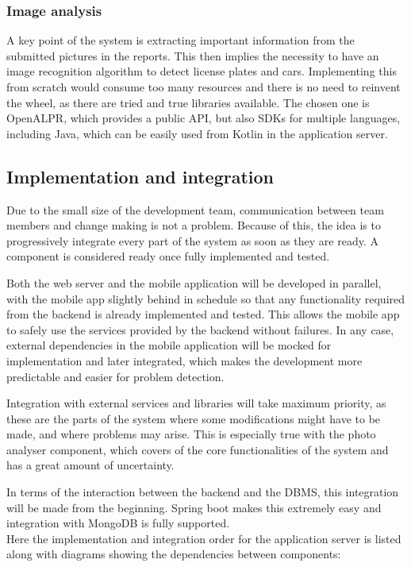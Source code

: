 \subsubsection{Image analysis}
A key point of the system is extracting important information from the submitted pictures in the reports. This then implies the necessity to have an image recognition algorithm to detect license plates and cars. Implementing this from scratch would consume too many resources and there is no need to reinvent the wheel, as there are tried and true libraries available. The chosen one is OpenALPR, which provides a public API, but also SDKs for multiple languages, including Java, which can be easily used from Kotlin in the application server.


\subsection{Implementation and integration}
Due to the small size of the development team, communication between team members and change making is not a problem. Because of this, the idea is to progressively integrate every part of the system as soon as they are ready. A component is considered ready once fully implemented and tested.

Both the web server and the mobile application will be developed in parallel, with the mobile app slightly behind in schedule so that any functionality required from the backend is already implemented and tested. This allows the mobile app to safely use the services provided by the backend without failures. In any case, external dependencies in the mobile application will be mocked for implementation and later integrated, which makes the development more predictable and easier for problem detection.

Integration with external services and libraries will take maximum priority, as these are the parts of the system where some modifications might have to be made, and where problems may arise. This is especially true with the photo analyser component, which covers of the core functionalities of the system and has a great amount of uncertainty. 

In terms of the interaction between the backend and the DBMS, this integration will be made from the beginning. Spring boot makes this extremely easy and integration with MongoDB is fully supported.\\

Here the implementation and integration order for the application server is listed along with diagrams showing the dependencies between components:\\

